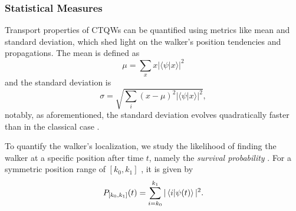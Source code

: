 \documentclass[main.tex]{subfiles}
\begin{document}
\subsubsection{Statistical Measures}

Transport properties of CTQWs can be quantified using metrics like mean and
standard deviation, which shed light on the walker's position tendencies and
propagations. The mean is defined as
\begin{equation}
    \mu = \sum_{x} x |\langle \psi | x \rangle|^2
\end{equation}
and the standard deviation is
\begin{equation}
    \sigma = \sqrt{\sum_{i} (x - \mu)^2 |\langle \psi | x \rangle|^2},
\end{equation}
notably, as aforementioned, the standard deviation evolves quadratically faster
than in the classical case \cite{grimmett2003}.


To quantify the walker's localization, we study the likelihood of finding the
walker at a specific position after time $t$, namely the \textit{survival
probability} \cite{Goenuelol2011}. For a symmetric position range of $ 
[k_0,k_1]$ , it is given by
\begin{equation}
    P_{[k_0,k_1]}(t) = \sum_{i=k_0}^{k_1} |\bra{i}\ket{\psi(t)}|^2.
\end{equation}

\end{document}
